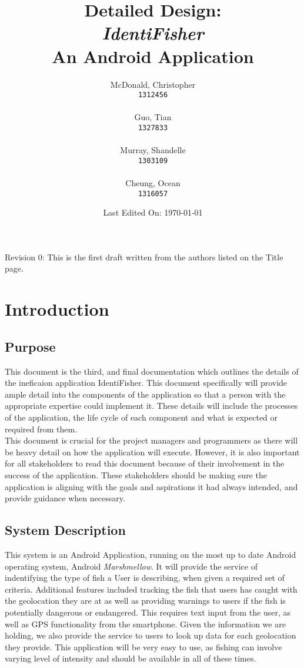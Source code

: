 \documentclass[]{article}
\title{Detailed Design: \\ \textit{IdentiFisher} \\ An Android Application \\}
\author{
\Large McDonald, Christopher\\
\texttt{1312456} \\ \\
\Large Guo, Tian\\
\texttt{1327833} \\ \\
\Large Murray, Shandelle\\
\texttt{1303109} \\ \\
\Large Cheung, Ocean\\
\texttt{1316057} \\
}
\date{Last Edited On: \today}
\begin{document}
\maketitle	

\newpage

\tableofcontents
\vfill
Revision 0: This is the first draft written from the authors listed on the Title page.
\pagebreak
\section{Introduction}
\label{sec:introduction}

\subsection{Purpose}
\label{sub:purpose}

This document is the third, and final documentation which outlines the details of the ineficaion application IdentiFisher. This document specifically will provide ample detail into the components of the application so that a person with the appropriate expertise could implement it. These details will include the processes of the application, the life cycle of each component and what is expected or required from them. \\
This document is crucial for the project managers and programmers as there will be heavy detail on how the application will execute. However, it is also important for all stakeholders to read this document because of their involvement in the success of the application. These stakeholders should be making sure the application is aligning with the goals and aspirations it had always intended, and provide guidance when necessary.

\subsection{System Description}
\label{sub:system_description}

This system is an Android Application, running on the most up to date Android operating system, Android \textit{Marshmellow}. It will provide the service of indentifying the type of fish a User is describing, when given a required set of criteria. Additional features included tracking the fish that users has caught with the geolocation they are at as well as providing warnings to users if the fish is potentially dangerous or endangered. This requires text input from the user, as well as GPS functionality from the smartphone. Given the information we are holding, we also provide the service to users to look up data for each geolocation they provide. This application will be very easy to use, as fishing can involve varying level of intensity and should be available in all of these times.
\end{document}
